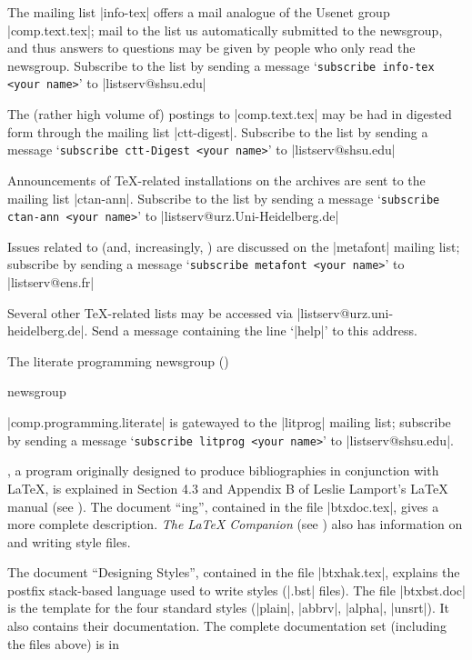 The mailing list |info-tex| offers a mail analogue of the Usenet group
\Newsgroup|comp.text.tex|; mail to the list us automatically submitted
to the newsgroup, and thus answers to questions may be given by people
who only read the newsgroup.  Subscribe to the list by sending a
message `\texttt{subscribe info-tex <your name>}' to \Email|listserv@shsu.edu|

The (rather high volume of) postings to \Newsgroup|comp.text.tex| may
be had in digested form through the mailing list |ctt-digest|.
Subscribe to the list by sending a message
`\texttt{subscribe ctt-Digest <your name>}' to \Email|listserv@shsu.edu|

Announcements of \TeX{}-related installations on the 
archives are sent to the mailing list |ctan-ann|.  Subscribe
to the list by sending a message `\texttt{subscribe ctan-ann <your name>}' to
\Email|listserv@urz.Uni-Heidelberg.de|

Issues related to \MF{} (and, increasingly, \MP{}) are discussed on
the |metafont| mailing list; subscribe by sending a message
`\texttt{subscribe metafont <your name>}' to \Email|listserv@ens.fr|

Several other \TeX{}-related lists may be accessed via
\Email|listserv@urz.uni-heidelberg.de|.  Send a message containing
the line `|help|' to this address.

The 
\htmlignore
literate programming newsgroup ()
\endhtmlignore
\begin{htmlversion}
   newsgroup
\end{htmlversion}
\Newsgroup|comp.programming.literate| is gatewayed to the |litprog|
mailing list; subscribe by sending a message
`\texttt{subscribe litprog <your name>}' to \Email|listserv@shsu.edu|.


\BibTeX{}, a program originally designed to produce bibliographies in
conjunction with \LaTeX{}, is explained in Section 4.3 and Appendix B
of Leslie Lamport's \LaTeX{} manual
(see ).
The document ``\BibTeX{}ing'', contained in the file |btxdoc.tex|,
gives a more complete description.  \emph{The \LaTeX{} Companion}
(see ) also
has information on \BibTeX{} and writing \BibTeX{} style files.

The document ``Designing \BibTeX{} Styles'', contained in the file
|btxhak.tex|, explains the postfix stack-based language used to write
\BibTeX{} styles (|.bst| files). The file |btxbst.doc| is the template
for the four standard styles (|plain|, |abbrv|, |alpha|, |unsrt|). It
also contains their documentation.
The complete \BibTeX{} documentation set (including the files above)
is in 


